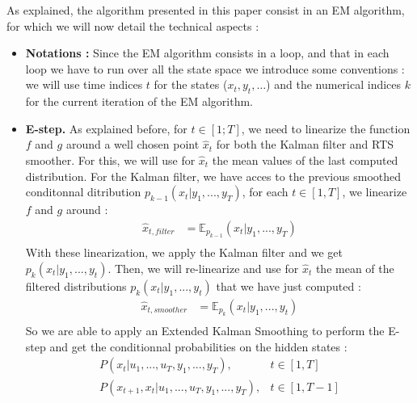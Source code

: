 \documentclass[11pt, oneside]{amsart}
\begin{document}
As explained, the algorithm presented in this paper consist in an EM algorithm, for which we will now detail the technical aspects :
\begin{itemize}
  \item \textbf{Notations :} Since the EM algorithm consists in a loop, and that in each loop we have to run over all the state space we introduce some conventions : we will use time indices $t$ for the states ($x_t, y_t,\ldots$) and the numerical indices $k$ for the current iteration of the EM algorithm.
  
  \item \textbf{E-step.}
   As explained before, for $t \in \left [ 1; T \right ]$, we need to linearize the function $f$ and $g$ around a well chosen point $\hat{x}_t$ for both the Kalman filter and RTS smoother.
   For this, we will use for $\hat{x}_t$ the mean values of the last computed distribution. 
For the Kalman filter, we have acces to the previous smoothed conditonnal ditribution $p_{k-1}(x_t | y_1, ... , y_T)$, for each $ t \in [1, T]$, we linearize $f$ and $g$ around :
 \begin{align*}
 	\hat{x}_{t, filter} &= \mathbb{E}_{p_{k-1}}(x_t | y_1, ... , y_T)\\
\end{align*}
With these linearization, we apply the Kalman filter and we get $p_{k}(x_t | y_1, ... , y_t)$.
Then, we will re-linearize and use for $\hat{x}_t$ the mean of the filtered distributions $p_{k}(x_t | y_1, ... , y_t)$ that we  have just computed : 
 \begin{align*}
 	\hat{x}_{t, smoother} &= \mathbb{E}_{p_{k}}(x_t | y_1, ... , y_t)\\
\end{align*}
So we are able to apply an Extended Kalman Smoothing to perform the E-step and get the conditionnal probabilities on the hidden states :
    \begin{align*}
      P(x_t |u_1, ..., u_T, y_1, ... , y_T),& t \in [1,T]\\
      P(x_{t+1}, x_t |u_1, ..., u_T, y_1, ... , y_T),& t \in [1,T-1]\\
    \end{align*} 
 

\end{itemize}
\end{document}
